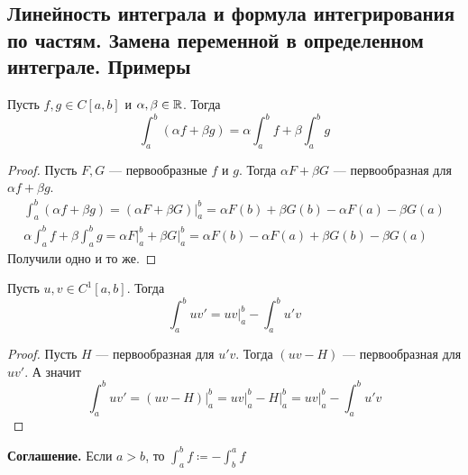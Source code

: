 \subsection{Линейность интеграла и формула интегрирования по частям. Замена переменной в определенном интеграле. Примеры}

\begin{theorem}
    Пусть $f, g \in C[a, b]$ и $\alpha, \beta \in \mathbb{R}$. Тогда
    \begin{equation*}
    \int_{a}^{b}(\alpha f + \beta g) = \alpha \int_{a}^{b} f + \beta \int_{a}^{b} g
    \end{equation*}
\end{theorem}
\begin{proof}
    Пусть $F, G$ --- первообразные $f$ и $g$. Тогда $\alpha F + \beta G$ --- первообразная для $\alpha f + \beta g$.
    \begin{equation*}
        \begin{gathered}
          \int_{a}^{b}(\alpha f + \beta g) =
          (\alpha F + \beta G) \big|_{a}^{b} =
          \alpha F(b) + \beta G(b) - \alpha F(a) - \beta G(a)\\
          \alpha \int_{a}^{b} f + \beta \int_{a}^{b} g =
          \alpha F \big|_a^{b} + \beta G \big|_{a}^{b} =
          \alpha F(b) - \alpha F(a) + \beta G(b) - \beta G(a)
        \end{gathered}
    \end{equation*}
    Получили одно и то же.
\end{proof}

\begin{theorem}
    Пусть $u, v \in C^{1}[a, b]$. Тогда
    \begin{equation*}
        \int_{a}^{b} uv' = uv \big|_{a}^{b} - \int_{a}^{b} u'v
    \end{equation*}
\end{theorem}
\begin{proof}
  Пусть $H$ --- первообразная для $u'v$. Тогда $(uv - H)$ --- первообразная для $uv'$. А значит
  \begin{equation*}
    \int_{a}^{b} uv' = (uv - H) \big|_{a}^{b} = uv \big|_{a}^{b} - H \big|_{a}^{b} = uv|_{a}^{b} - \int_{a}^{b} u'v
  \end{equation*}
\end{proof}

\textbf{Соглашение.} Если $a > b$, то $\displaystyle \int_{a}^{b} f \coloneqq -\int_{b}^{a} f$

